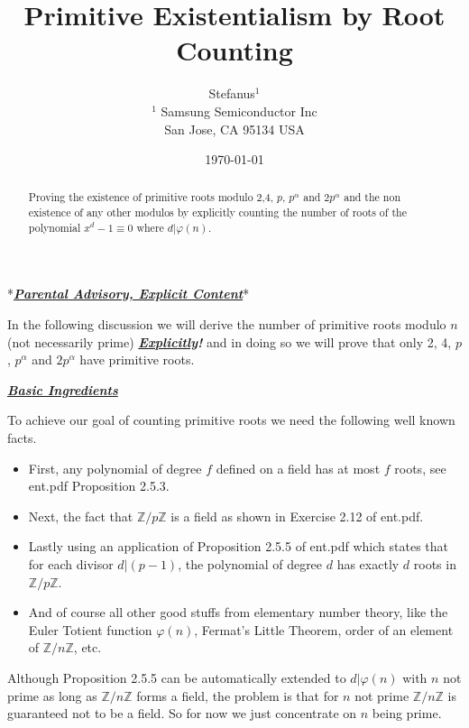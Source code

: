 \documentclass[aps,preprint,preprintnumbers,nofootinbib,showpacs,prd]{revtex4-1}
\newcommand{\bit}{\begin{itemize}}
\newcommand{\eit}{\end{itemize}}
\begin{document}
\title{Primitive Existentialism by Root Counting}
\bigskip
\author{Stefanus$^1$\\
$^1$ Samsung Semiconductor Inc\\ San Jose, CA 95134 USA\\
}
%
\date{\today}
%
\begin{abstract}
Proving the existence of primitive roots modulo 2,4, $p$, $p^\alpha$ and $2p^\alpha$ and the non existence of any other modulos by explicitly counting the number of roots of the polynomial $x^d - 1\equiv 0$ where $d|\varphi(n)$.

\end{abstract}
%
\maketitle

\renewcommand{\theequation}{A.\arabic{equation}}  %
\setcounter{equation}{0}  %

*\hspace{0.5mm}\underline{\textit{\textbf {Parental Advisory, Explicit Content}}}\hspace{0.7mm}*

In the following discussion we will derive the number of primitive roots modulo $n$ (not necessarily prime) \underline{\textbf{\textit{Explicitly}}}\textbf{\textit{!}} and in doing so we will prove that only 2, 4, $p$, $p^\alpha$ and $2p^\alpha$ have primitive roots.

\bigskip
\underline{\textit{\textbf{Basic Ingredients}}}
\bigskip

To achieve our goal of counting primitive roots we need the following well known facts.
\bit
%
\item First, any polynomial of degree $f$ defined on a field has at most $f$ roots, see ent.pdf Proposition 2.5.3.
%
\item Next, the fact that $\mathbb{Z}/p\mathbb{Z}$ is a field as shown in Exercise 2.12 of ent.pdf.
%
\item Lastly using an application of Proposition 2.5.5 of ent.pdf which states that for each divisor $d|(p-1)$, the polynomial of degree $d$ has exactly $d$ roots in $\mathbb{Z}/p\mathbb{Z}$.
%
\item And of course all other good stuffs from elementary number theory, like the Euler Totient function $\varphi(n)$, Fermat's Little Theorem, order of an element of $\mathbb{Z}/n\mathbb{Z}$, etc.
%
\eit
%
Although Proposition 2.5.5 can be automatically extended to $d|\varphi(n)$ with $n$ not prime as long as $\mathbb{Z}/n\mathbb{Z}$ forms a field, the problem is that for $n$ not prime $\mathbb{Z}/n\mathbb{Z}$ is guaranteed not to be a field. So for now we just concentrate on $n$ being prime.
\end{document}
